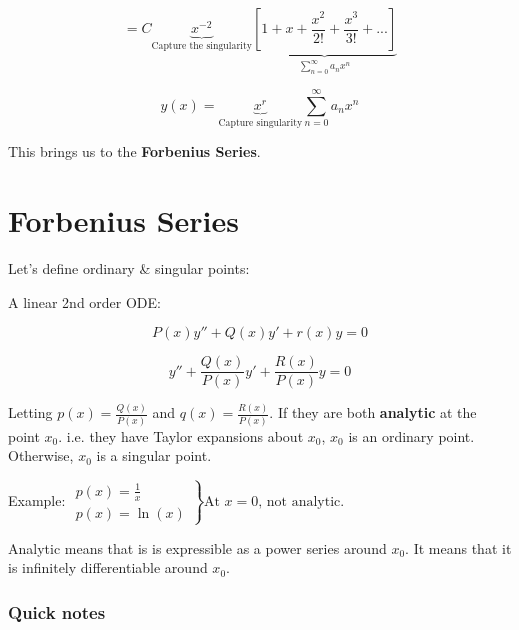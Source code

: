 \documentclass{article}
\begin{document}
$$ = C \underbrace{x^{-2}}_{\text{Capture the singularity}} \underbrace{\left[ 1 + x + \frac{x^2}{2!} + \frac{x^3}{3!} + ... \right]}_{\sum_{n = 0}^{\infty} a_n x^n}$$

$$ y(x) = \underbrace{x^r}_{\text{Capture singularity}} \sum_{n = 0}^{\infty} a_n x^n$$

This brings us to the \textbf{Forbenius Series}. 

\section{Forbenius Series}

Let's define ordinary \& singular points:

A linear 2nd order ODE:

$$P(x) y'' + Q(x) y' + r(x) y = 0$$

$$y'' + \frac{Q(x)}{P(x)} y' + \frac{R(x)}{P(x)} y = 0$$

Letting $p(x) = \frac{Q(x)}{P(x)}$ and $q(x) = \frac{R(x)}{P(x)}$. If they are both \textbf{analytic} at the point $x_0$. i.e. they have Taylor expansions about $x_0$, $x_0$ is an ordinary point. Otherwise, $x_0$ is a singular point. 

Example: $\left. \begin{matrix} p(x) = \frac{1}{x} \\ p(x) = \ln(x) \end{matrix} \right\} \text{At } x = 0 \text{, not analytic}$.

Analytic means that is is expressible as a power series around $x_0$. It means that it is infinitely differentiable around $x_0$. 

\subsubsection{Quick notes}
\end{document}
